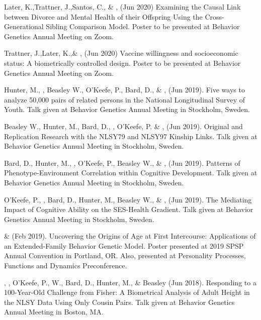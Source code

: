 
\item Later, K.,\nota Trattner, J.,\nota Santos, C., \& \meb, (Jun 2020) Examining the Causal Link between Divorce and Mental Health of their Offspring Using the Cross-Generational Sibling Comparison Model. Poster to be presented at Behavior Genetics Annual Meeting on Zoom. 

\item Trattner, J.,\nota Later, K.,\nota \& \meb, (Jun 2020) Vaccine willingness and socioeconomic status: A biometrically controlled design. Poster to be presented at Behavior Genetics Annual Meeting on Zoom. 



\item Hunter, M., \meb, Beasley W., O'Keefe, P.,  Bard, D., \&   \Joe, (Jun 2019). Five ways to analyze 50,000 pairs of related persons in the National Longitudinal Survey of Youth. Talk given at Behavior Genetics Annual Meeting in Stockholm, Sweden. 

\item Beasley W., Hunter, M., Bard, D., \meb, O'Keefe, P. \&  \Joe, (Jun 2019). Original and Replication Research with the NLSY79 and NLSY97 Kinship Links. Talk given at Behavior Genetics Annual Meeting in Stockholm, Sweden. 

\item Bard, D., Hunter, M., \meb, O'Keefe, P., Beasley W.,  \&  \Joe, (Jun 2019). Patterns of Phenotype-Environment Correlation within Cognitive Development. Talk given at Behavior Genetics Annual Meeting in Stockholm, Sweden. 

\item O'Keefe, P., \meb, Bard, D., Hunter, M.,  Beasley W.,  \&  \Joe, (Jun 2019). The Mediating Impact of Cognitive Ability on the SES-Health Gradient. Talk given at Behavior Genetics Annual Meeting in Stockholm, Sweden. 

\item \meb \& \Joe (Feb 2019). Uncovering the Origins of Age at First Intercourse: Applications of an Extended-Family Behavior Genetic Model. Poster presented at 2019 SPSP Annual Convention in Portland, OR. Also, presented at Personality Processes, Functions and Dynamics Preconference.

\item\Joe, \meb, O'Keefe, P., W., Bard, D., Hunter, M., \& Beasley (Jun 2018). Responding to a 100-Year-Old Challenge from Fisher: A Biometrical Analysis of Adult Height in the NLSY Data Using Only Cousin Pairs. Talk given at Behavior Genetics Annual Meeting in Boston, MA. 

